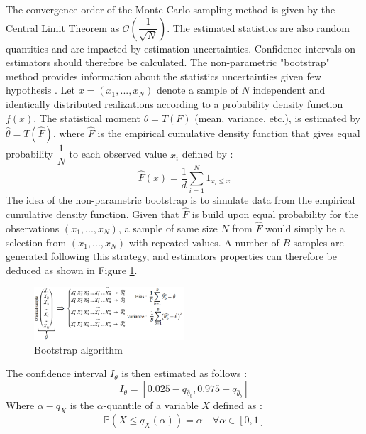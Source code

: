 The convergence order of the Monte-Carlo sampling method is given by the Central Limit Theorem \cite{bib16} as $\mathcal{O}\left(\dfrac{1}{\sqrt N}\right)$. The estimated statistics are also random quantities and are impacted by estimation uncertainties. Confidence intervals on estimators should therefore be calculated. The non-parametric "bootstrap" method provides information about the statistics uncertainties given few hypothesis \cite{bib1}. Let $x=(x_1,...,x_N)$ denote a sample of $N$ independent and identically distributed realizations according to a probability density function $f(x)$. The statistical moment $\theta=T(F)$ (mean, variance, etc.), is estimated by $\hat{\theta}=T(\hat{F})$, where $\hat{F}$ is the empirical cumulative density function that gives equal probability $\dfrac{1}{N}$ to each observed value $x_i$ defined by :
\begin{equation}
\hat{F}(x) =\dfrac{1}{d} \sum_{i=1}^N 1_{x_i\leq x}
\end{equation}
The idea of the non-parametric bootstrap is to simulate data from the empirical cumulative density function. Given that $\hat{F}$ is build upon equal probability for the observations $(x_1,...,x_N)$, a sample of same size $N$ from $\hat{F}$ would simply be a selection from $(x_1,...,x_N)$ with repeated values. A number of $B$ samples are generated following this strategy, and estimators properties can therefore be deduced as shown in Figure \ref{fig:algo_boots}.
\begin{figure}[!h]
\centering
\includegraphics[trim={0 0 0 0.3cm},clip, width=0.5\textwidth]{./Images/bootstrap}
\vspace{-0.5cm}
\caption{Bootstrap algorithm \cite{bib1}}
\label{fig:algo_boots}
\vspace{-0.5cm}
\end{figure}

The confidence interval $I_\theta$ is then estimated as follows :
\begin{equation}
	I_\theta=[0.025-q_{\widehat{\theta}_b},0.975-q_{\widehat{\theta}_b}]
\label{teta_confidence}
\end{equation}
Where $\alpha-q_{X}$ is the $\alpha$-quantile of a variable $X$ defined as :
\begin{equation}
\mathbb{P}(X\leq q_X(\alpha))=\alpha \quad \forall \alpha \in [0,1]
\end{equation}
